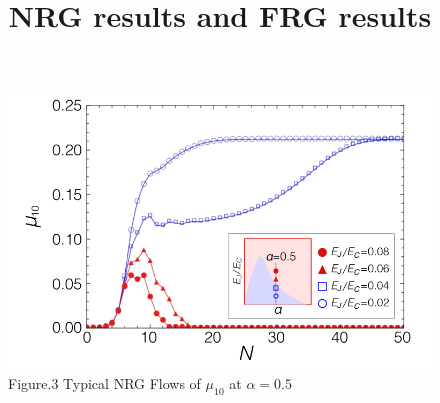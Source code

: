 \documentclass{article}
\title{NRG results and FRG results}
\begin{document}
\maketitle
\begin{figure}[!h]
    \centerline{\includegraphics[width=\columnwidth]{Phy129087001_2.png}}
    \caption{Figure.3 Typical NRG Flows of $\mu_{10}$ at $\alpha=0.5$}
    \label{figure_3} 
\end{figure}
\end{document}
